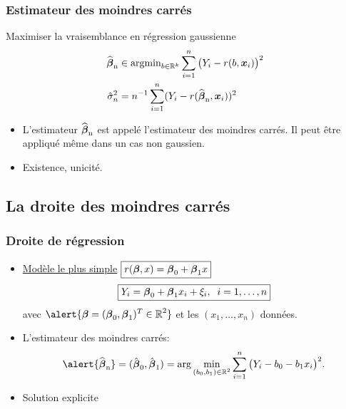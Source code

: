 \begin{frame}
\frametitle{Estimateur des moindres carrés} 
Maximiser la
\alert{ vraisemblance} en régression gaussienne 
\begin{align*}
\operatorname{\widehat{\boldsymbol{\beta}}_n} &\in \mathrm{argmin}_{b \in \mathbb{R}^k} \sum_{i = 1}^n \big(Y_i-r(b,\operatorname{\boldsymbol{x}}_i)\big)^2 \\
\hat{\sigma}_n^2 &= n^{-1} \sum_{i=1}^n (Y_i - r(\operatorname{\widehat{\boldsymbol{\beta}}_n},\operatorname{\boldsymbol{x}}_i))^2
\end{align*}
\begin{itemize}
\item  L'estimateur $\operatorname{\widehat{\boldsymbol{\beta}}_n}$ est appelé l'\alert{estimateur des moindres carrés}. Il peut être appliqué même dans un cas non gaussien.
\item \alert{ Existence, unicité.}
\end{itemize}
\end{frame}

\subsection{La droite des moindres carrés}

\begin{frame}
\frametitle{Droite de régression}
\begin{itemize}
\item \underline{Modèle le plus simple}
$\boxed{r(\boldsymbol{\beta},x)= \boldsymbol{\beta}_0 + \boldsymbol{\beta}_1 x}$
$$\boxed{Y_i = \boldsymbol{\beta}_0 + \boldsymbol{\beta}_1 x_i+\xi_i,\;\;i=1,\ldots,n}$$
avec $\alert{\truebeta = (\truebeta_0,\truebeta_1)^T \in \R^2}$ et les
$(x_1,\ldots, x_n)$ données.
\item L'estimateur des moindres carrés:
$$\alert{\estregress}=(\hat{\truebeta}_0, \hat{\truebeta}_1) =
\arg \min_{(\curbeta_0,\curbeta_1)\in \R^2}\sum_{i = 1}^n \big(Y_i- \curbeta_0 - \curbeta_1 x_i\big)^2.
$$
\item \alert{Solution explicite}
\end{itemize}
\end{frame}

